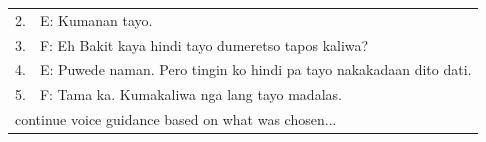 \begin{table}[h]
\begin{tabular}{ll}
\multicolumn{1}{|l}{2.}  & \multicolumn{1}{l|}{E: Kumanan tayo.}                 \\
\multicolumn{1}{|l}{3.} & \multicolumn{1}{l|}{F: Eh Bakit kaya hindi tayo dumeretso tapos kaliwa?}                 \\
\multicolumn{1}{|l}{4.} & \multicolumn{1}{l|}{E: Puwede naman. Pero tingin ko hindi pa tayo nakakadaan dito dati.} \\
\multicolumn{1}{|l}{5.} & \multicolumn{1}{l|}{F: Tama ka. Kumakaliwa nga lang tayo madalas.}                       \\ \hline
\multicolumn{2}{l}{continue voice guidance based on what was chosen...}          \\ \hline
\end{tabular}
\end{table}

